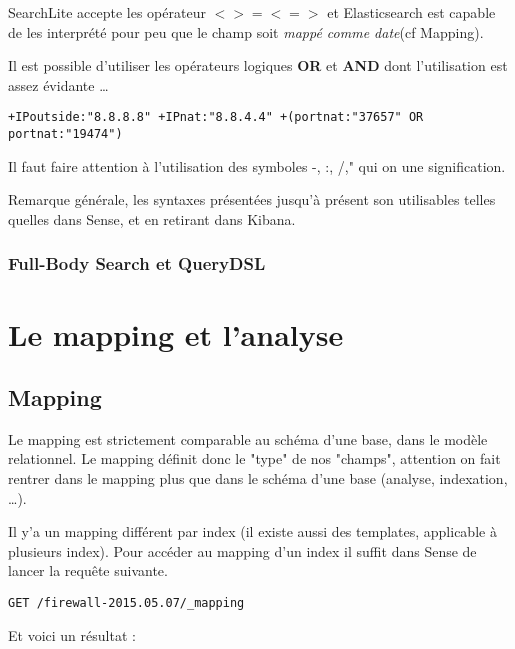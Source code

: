 SearchLite accepte les opérateur $< > =< =>$ et Elasticsearch est capable de les 
interprété pour peu que le champ soit \textit{mappé comme date}(cf Mapping).

Il est possible d'utiliser les opérateurs logiques \textbf{OR} et \textbf{AND} 
dont l'utilisation est assez évidante \ldots
\begin{lstlisting}[style=code,label={lst:APIsearchliteexample6},caption={Opérateurs logiques}]
+IPoutside:"8.8.8.8" +IPnat:"8.8.4.4" +(portnat:"37657" OR portnat:"19474")
\end{lstlisting}

Il faut faire attention à l'utilisation des symboles -, :, /," qui on une signification.


Remarque générale, les syntaxes présentées jusqu'à présent son utilisables telles
quelles dans Sense, et en retirant  dans Kibana.


\subsubsection{Full-Body Search et QueryDSL}

\section{Le mapping et l'analyse}
\subsection{Mapping}
Le mapping est strictement comparable au schéma d'une base, dans le modèle relationnel.
Le mapping définit donc le "type" de nos "champs", attention on fait rentrer dans 
le mapping plus que dans le schéma d'une base (analyse, indexation, \ldots).

Il y'a un mapping différent par index (il existe aussi des templates, applicable 
à plusieurs index). Pour accéder au mapping d'un index il suffit dans Sense de lancer
la requête suivante.

\begin{lstlisting}[style=code,label={lst:mappingget1},caption={Obtenir un mapping}]
GET /firewall-2015.05.07/_mapping
\end{lstlisting}

Et voici un résultat :


